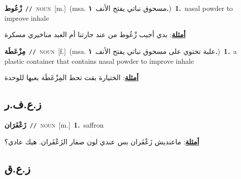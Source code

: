 \documentclass[10pt,a4paper,twoside]{article} %
\begin{document}
\begin{multicols}{2}
{\setlength\topsep{0pt}\textbf{\foreignlanguage{arabic}{زْعُوط}}\ {\color{gray}\texttt{//}\color{black}}\ \textsc{noun}\ [m.]\ \color{gray}(msa. \foreignlanguage{arabic}{مسحوق نباتي يفتح الأنف}~\foreignlanguage{arabic}{\textbf{١.}})\color{black}\ \textbf{1.}~nasal powder to improve inhale\  \begin{flushright}\color{gray}\foreignlanguage{arabic}{\textbf{\underline{\foreignlanguage{arabic}{أمثلة}}}: بدي أجيب زْعُوط من عند جارتنا أم العبد مناخيري مسكرة}\end{flushright}\color{black}} \vspace{2mm}

{\setlength\topsep{0pt}\textbf{\foreignlanguage{arabic}{مِزْعَطَة}}\ {\color{gray}\texttt{//}\color{black}}\ \textsc{noun}\ [f.]\ \color{gray}(msa. \foreignlanguage{arabic}{علبة تحتوي على مسحوق نباتي يفتح الأنف}~\foreignlanguage{arabic}{\textbf{١.}})\color{black}\ \textbf{1.}~a plastic container that contains nasal powder to improve inhale\  \begin{flushright}\color{gray}\foreignlanguage{arabic}{\textbf{\underline{\foreignlanguage{arabic}{أمثلة}}}: الختيارة بقت تحط المِزْعَطَة بعبها للوحدة}\end{flushright}\color{black}} \vspace{2mm}

\vspace{-3mm}
\subsection*{\color{blue}\foreignlanguage{arabic}{ز.ع.ف.ر}\color{blue}{}} 

{\setlength\topsep{0pt}\textbf{\foreignlanguage{arabic}{زَعْفَرَان}}\ {\color{gray}\texttt{//}\color{black}}\ \textsc{noun}\ [m.]\ \textbf{1.}~saffron\  \begin{flushright}\color{gray}\foreignlanguage{arabic}{\textbf{\underline{\foreignlanguage{arabic}{أمثلة}}}: ماعنديش زَعْفَران بس عندي لون صفار الزَعْفَران. هيك عادي؟}\end{flushright}\color{black}} \vspace{2mm}

\vspace{-3mm}
\subsection*{\color{blue}\foreignlanguage{arabic}{ز.ع.ق}\color{blue}{}} 


\end{multicols}
\end{document}
